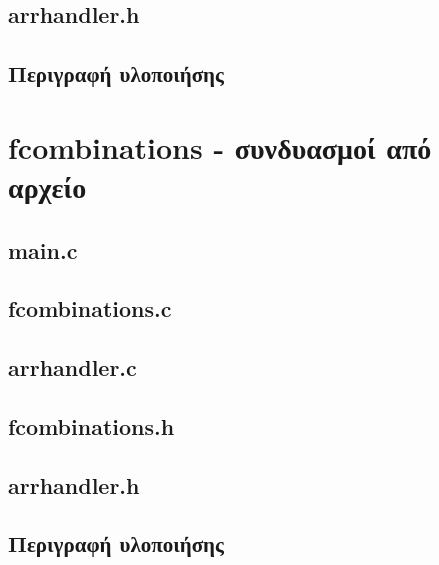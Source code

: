 \documentclass{article}
\begin{document}
    \subsection{arrhandler.h}
        

    \subsection{Περιγραφή υλοποιήσης}

    
\section{fcombinations - συνδυασμοί από αρχείο}

    \subsection{main.c}
        

    \subsection{fcombinations.c}
        

    \subsection{arrhandler.c}
        

    \subsection{fcombinations.h}
        

    \subsection{arrhandler.h}
         

    \subsection{Περιγραφή υλοποιήσης}

    
\end{document}
